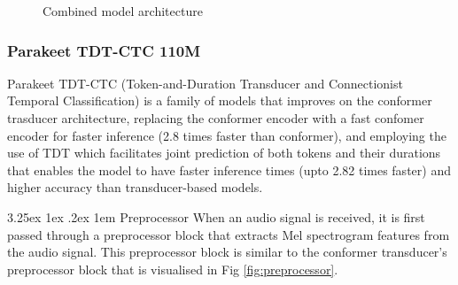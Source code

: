 \documentclass{CSSRforAfrica}
\makeatletter
\renewcommand\paragraph{\@startsection{paragraph}{4}{0pt}%
  {3.25ex \@plus1ex \@minus.2ex}%
  {1em}%
  {\normalfont\normalsize\itshape}}
\makeatother
\begin{document}
\begin{figure}[thb]
\begin{center}
\end{center}
\caption{Combined model architecture}
\label{fig:combined}
\end{figure}

\subsubsection{Parakeet TDT-CTC 110M}
Parakeet TDT-CTC (Token-and-Duration Transducer and Connectionist Temporal Classification) is a family of models that improves on the conformer trasducer architecture, replacing the conformer encoder with a fast confomer encoder \cite{rekesh2023fastconformerlinearlyscalable} for faster inference (2.8 times faster than conformer), and employing the use of TDT \cite{xu2023efficientsequencetransductionjointly} which facilitates joint prediction of both tokens and their durations that enables the model to have faster inference times (upto 2.82 times faster) and higher accuracy than transducer-based models.

\paragraph{Preprocessor}
When an audio signal is received, it is first passed through a preprocessor block that extracts Mel spectrogram features from the audio signal. This preprocessor block is similar to the conformer transducer's preprocessor block that is visualised in Fig \ref{fig:preprocessor}.
\end{document}
